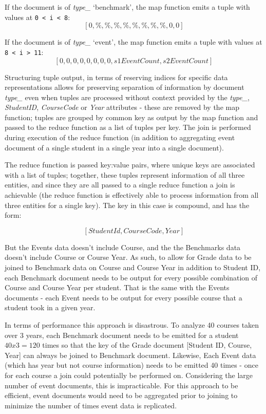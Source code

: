If the document is of \textit{type\_} `benchmark', the map function emits a tuple with values at \texttt{0 < i < 8}: \[[0, \%, \%, \%, \%, \%, \%, \%, \%, 0, 0]\]

If the document is of \textit{type\_} ‘event’, the map function emits a tuple with values at \texttt{8 < i > 11}: \[[0, 0, 0, 0, 0, 0, 0, 0, s1EventCount, s2EventCount]\]

Structuring tuple output, in terms of reserving indices for specific data representations allows for preserving separation of information by document \textit{type\_} even when tuples are processed without context provided by the \textit{type\_}, \textit{StudentID}, \textit{CourseCode} or \textit{Year} attributes - these are removed by the map function; tuples are grouped by common key as output by the map function and passed to the reduce function as a list of tuples per key. The join is performed during execution of the reduce function (in addition to aggregating event document of a single student in a single year into a single document).

The reduce function is passed key:value pairs, where unique keys are associated with a list of tuples; together, these tuples represent information of all three entities, and since they are all passed to a single reduce function a join is achievable (the reduce function is effectively able to process information from all three entities for a single key). The key in this case is compound, and has the form:

\[[StudentId,CourseCode,Year]\]

But the Events data doesn't include Course, and the the Benchmarks data doesn't include Course or Course Year. As such, to allow for Grade data to be joined to Benchmark data on Course and Course Year in addition to Student ID, each Benchmark document needs to be output for every possible combination of Course and Course Year per student. That is the same with the Events documents - each Event needs to be output for every possible course that a student took in a given year.

In terms of performance this approach is disastrous. To analyze 40 courses taken over 3 years, each Benchmark document needs to be emitted for a student $40 x 3 = 120$ times so that the key of the Grade document [Student ID, Course, Year] can always be joined to Benchmark document. Likewise, Each Event data (which has year but not course information) needs to be emitted 40 times - once for each course a join could potentially be performed on. Considering the large number of event documents, this is impracticable. For this approach to be efficient, event documents would need to be aggregated prior to joining to minimize the number of times event data is replicated.

